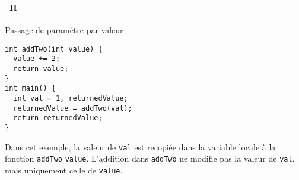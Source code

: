 \begin{frame}[containsverbatim]
  \frametitle{\secname}
  \framesubtitle{\subsecname~II}

  \begin{exampleblock}{Passage de paramètre par valeur}
    \begin{verbatim}
int addTwo(int value) {
  value += 2;
  return value;
}
int main() {
  int val = 1, returnedValue;
  returnedValue = addTwo(val);
  return returnedValue;
}\end{verbatim}
  \end{exampleblock}
  \vspace{0.3cm}
  \par
  Dans cet exemple, la valeur de \texttt{val} est recopiée dans la variable locale à la fonction \texttt{addTwo} \texttt{value}.
  L'addition dans \texttt{addTwo} ne modifie pas la valeur de \texttt{val}, mais uniquement celle de \texttt{value}.
\end{frame}


